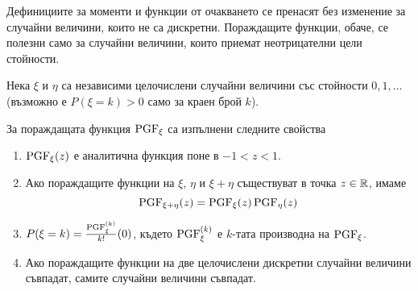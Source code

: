 \documentclass[numbers=endperiod, DIV=15, bibliography=totocnumbered]{scrartcl}
\begin{document}
\begin{note}
  Дефинициите за моменти и функции от очакването се пренасят без изменение за случайни величини, които не са дискретни. Пораждащите функции, обаче, се полезни само за случайни величини, които приемат неотрицателни цели стойности.
\end{note}

\begin{theorem}
  Нека $\xi$ и $\eta$ са независими целочислени случайни величини със стойности $0, 1, \ldots$ (възможно е $P(\xi = k) > 0$ само за краен брой $k$).

  За пораждащата функция $\operatorname{PGF}_\xi$ са изпълнени следните свойства
  \begin{enumerate}
    \item $\operatorname{PGF}_\xi(z)$ е аналитична функция поне в $-1 < z < 1$.
    \item Ако пораждащите функции на $\xi$, $\eta$ и $\xi + \eta$ съществуват в точка $z \in \mathbb{R}$, имаме
    \begin{displaymath}
      \operatorname{PGF}_{\xi + \eta}(z) = \operatorname{PGF}_\xi(z) \operatorname{PGF}_\eta(z)
    \end{displaymath}

    \item $P(\xi = k) = \frac {\operatorname{PGF}_\xi^{(k)}} {k!} (0)$, където $\operatorname{PGF}_\xi^{(k)}$ е $k$-тата производна на $\operatorname{PGF}_\xi$.
    \item Ако пораждащите функции на две целочислени дискретни случайни величини съвпадат, самите случайни величини съвпадат.
  \end{enumerate}
\end{theorem}
\end{document}
